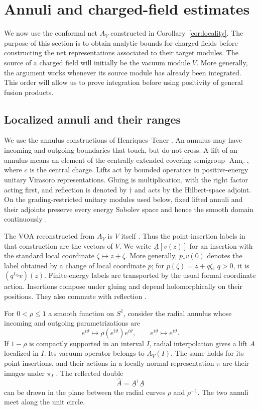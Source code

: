 \section{Annuli and charged-field estimates}\label{sec:annuli}

We now use the conformal net $A_V$ constructed in
Corollary~\ref{cor:locality}.  The purpose of this section is to obtain
analytic bounds for charged fields before constructing the net
representations associated to their target modules.  The source of a
charged field will initially be the vacuum module $V$.  More generally,
the argument works whenever its source module has already been integrated.
This order will allow us to prove integration before using positivity of
general fusion products.

\subsection{Localized annuli and their ranges}

We use the annulus constructions of Henriques--Tener
\cite{HTVirasoro,HTVOA,HTGenusZero}.  An annulus may have incoming and
outgoing boundaries that touch, but do not cross.  A lift of an annulus
means an element of the centrally extended covering semigroup
$\widetilde{\operatorname{Ann}}_c$, where $c$ is the central charge.
Lifts act by bounded operators in positive-energy unitary Virasoro
representations.  Gluing is multiplication, with the right factor acting
first, and reflection is denoted by $\dagger$ and acts by the Hilbert-space
adjoint.  On the grading-restricted unitary modules used below, fixed
lifted annuli and their adjoints preserve every energy Sobolev space and
hence the smooth domain continuously
\cite[Theorem~4.8, Remark~4.9 and Theorem~5.5]{HTVirasoro}.

The VOA reconstructed from $A_V$ is $V$ itself
\cite[Theorem~8.9(ii)]{HTVOA}.  Thus the point-insertion labels in that
construction are the vectors of $V$.  We write
$\underline A[v(z)]$ for an insertion with the standard local coordinate
$\zeta\mapsto z+\zeta$.  More generally, $p_*v(0)$ denotes the label
obtained by a change of local coordinate $p$; for
$p(\zeta)=z+q\zeta$, $q>0$, it is $(q^{L_0}v)(z)$.
Finite-energy labels are transported by the usual formal coordinate action.
Insertions compose under gluing and depend holomorphically on their
positions.  They also commute with reflection
\cite[Section~6 and Proposition~6.19]{HTVOA}.

For $0<\rho\leq1$ a smooth function on $S^1$, consider the radial annulus
whose incoming and outgoing parametrizations are
\[
 e^{i\vartheta}\longmapsto\rho(e^{i\vartheta})e^{i\vartheta},
 \qquad e^{i\vartheta}\longmapsto e^{i\vartheta}.
\]
If $1-\rho$ is compactly supported in an interval $I$, radial interpolation
gives a lift $\underline A$ localized in $I$.  Its vacuum operator belongs
to $A_V(I)$.  The same holds for its point insertions, and their actions
in a locally normal representation $\pi$ are their images under $\pi_I$
\cite[Lemma~6.8]{HTVOA}.  The reflected double
\[
 \widehat A=\underline A^\dagger\underline A
\]
can be drawn in the plane between the radial curves $\rho$ and
$\rho^{-1}$.  The two annuli meet along the unit circle.

